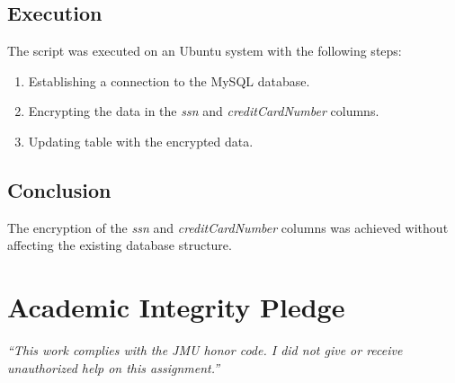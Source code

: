 \documentclass{article}
\begin{document}
\subsection*{Execution}
The script was executed on an Ubuntu system with the following steps:
\begin{enumerate}
    \item Establishing a connection to the MySQL database.
    \item Encrypting the data in the \textit{ssn} and \textit{creditCardNumber} columns.
    \item Updating table with the encrypted data.
\end{enumerate}

\subsection*{Conclusion}
The encryption of the \textit{ssn} and \textit{creditCardNumber} columns was achieved without affecting the existing database structure. 

\vfill
  \section*{Academic Integrity Pledge}
    {\color{red}\textit{“This work complies with the JMU honor code. I did not give or receive unauthorized help on this assignment.”}}
\end{document}
